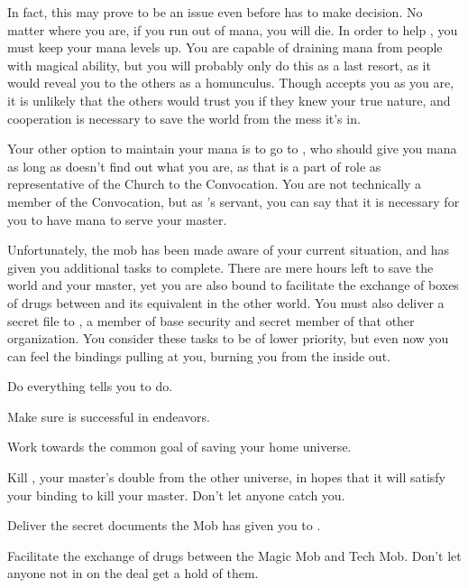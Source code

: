 \documentclass[char]{guildcamp3}
\begin{document}
	In fact, this may prove to be an issue even before \cNobleOne{} has to make \cNobleOne{\their} decision. No matter where you are, if you run out of mana, you will die. In order to help \cNobleOne{}, you must keep your mana levels up. You are capable of draining mana from people with magical ability, but you will probably only do this as a last resort, as it would reveal you to the others as a homunculus. Though \cNobleOne{} accepts you as you are, it is unlikely that the others would trust you if they knew your true nature, and cooperation is necessary to save the world from the mess it's in.
	
	Your other option to maintain your mana is to go to \cPaladin{}, who should give you mana as long as \cPaladin{\they} doesn't find out what you are, as that is a part of \cPaladin{\their} role as representative of the Church to the Convocation. You are not technically a member of the Convocation, but as \cNobleOne{}'s servant, you can say that it is necessary for you to have mana to serve your master.
	
	Unfortunately, the mob has been made aware of your current situation, and has given you additional tasks to complete. There are mere hours left to save the world and your master, yet you are also bound to facilitate the exchange of boxes of drugs between \bMagicMob{} and its equivalent in the other world. You must also deliver a secret file to \cSpecOpTwo{}, a member of base security and secret member of that other organization. You consider these tasks to be of lower priority, but even now you can feel the bindings pulling at you, burning you from the inside out.

\begin{itemz}[Goals]
	\item Do everything \cNobleOne{} tells you to do.
	\item Make sure \cNobleOne{} is successful in \cNobleOne{\their} endeavors.
	\item Work towards the common goal of saving your home universe.
	\item Kill \cPoliOne{}, your master's double from the other universe, in hopes that it will satisfy your binding to kill your master. Don't let anyone catch you.
	\item Deliver the secret documents the Mob has given you to \cSpecOpTwo{}.
	\item Facilitate the exchange of drugs between the Magic Mob and Tech Mob. Don't let anyone not in on the deal get a hold of them.
\end{itemz}
\end{document}
